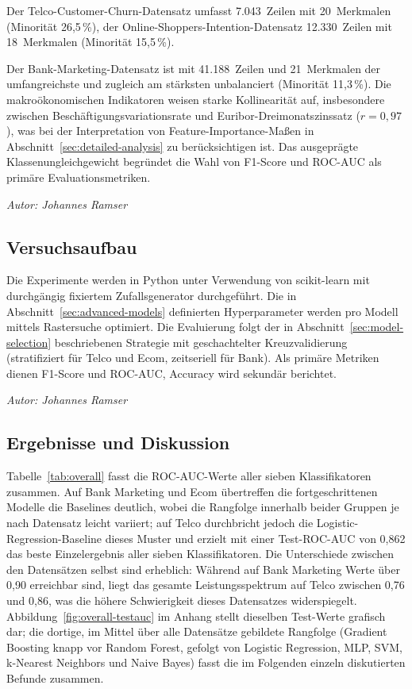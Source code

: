 \documentclass[10pt]{scrartcl}
\begin{document}
Der Telco-Customer-Churn-Datensatz \cite{TelcoDataset} umfasst 7.043~Zeilen mit 20~Merkmalen (Minorität 26,5\,\%), der Online-Shoppers-Intention-Datensatz 12.330~Zeilen mit 18~Merkmalen (Minorität 15,5\,\%).

Der Bank-Marketing-Datensatz \cite{Moro2014} ist mit 41.188~Zeilen und 21~Merkmalen der umfangreichste und zugleich am stärksten unbalanciert (Minorität 11,3\,\%). Die makroökonomischen Indikatoren weisen starke Kollinearität auf, insbesondere zwischen Beschäftigungsvariationsrate und Euribor-Dreimonatszinssatz ($r=0{,}97$), was bei der Interpretation von Feature-Importance-Maßen in Abschnitt~\ref{sec:detailed-analysis} zu berücksichtigen ist. Das ausgeprägte Klassenungleichgewicht begründet die Wahl von F1-Score und ROC-AUC als primäre Evaluationsmetriken.

\begin{flushright}\textit{Autor: Johannes Ramser}\end{flushright}

\subsection{Versuchsaufbau}

Die Experimente werden in Python unter Verwendung von scikit-learn \cite{Pedregosa2011} mit durchgängig fixiertem Zufallsgenerator durchgeführt. Die in Abschnitt~\ref{sec:advanced-models} definierten Hyperparameter werden pro Modell mittels Rastersuche optimiert. Die Evaluierung folgt der in Abschnitt~\ref{sec:model-selection} beschriebenen Strategie mit geschachtelter Kreuzvalidierung (stratifiziert für Telco und Ecom, zeitseriell für Bank). Als primäre Metriken dienen F1-Score und ROC-AUC, Accuracy wird sekundär berichtet.

\begin{flushright}\textit{Autor: Johannes Ramser}\end{flushright}

\subsection{Ergebnisse und Diskussion}

Tabelle~\ref{tab:overall} fasst die ROC-AUC-Werte aller sieben Klassifikatoren zusammen. Auf Bank Marketing und Ecom übertreffen die fortgeschrittenen Modelle die Baselines deutlich, wobei die Rangfolge innerhalb beider Gruppen je nach Datensatz leicht variiert; auf Telco durchbricht jedoch die Logistic-Regression-Baseline dieses Muster und erzielt mit einer Test-ROC-AUC von 0{,}862 das beste Einzelergebnis aller sieben Klassifikatoren. Die Unterschiede zwischen den Datensätzen selbst sind erheblich: Während auf Bank Marketing Werte über 0,90 erreichbar sind, liegt das gesamte Leistungsspektrum auf Telco zwischen 0,76 und 0,86, was die höhere Schwierigkeit dieses Datensatzes widerspiegelt. Abbildung~\ref{fig:overall-testauc} im Anhang stellt dieselben Test-Werte grafisch dar; die dortige, im Mittel über alle Datensätze gebildete Rangfolge (Gradient Boosting knapp vor Random Forest, gefolgt von Logistic Regression, MLP, SVM, k-Nearest Neighbors und Naive Bayes) fasst die im Folgenden einzeln diskutierten Befunde zusammen.
\end{document}
